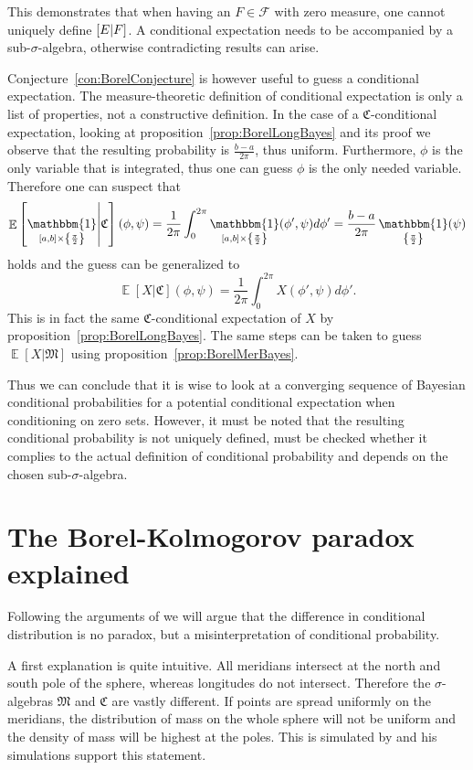\documentclass[twoside,a4paper]{report}
\theoremstyle{plain}
\theoremstyle{definition}
\theoremstyle{remark}
\numberwithin{equation}{chapter}
\let\P\relax
\DeclareMathOperator{\P}{\mathbb{P}}
\DeclareMathOperator{\E}{\mathbb{E}}
\DeclareMathOperator{\1}{\mathbbm{1}}
\newcommand{\F}{\mathcal{F}}
\begin{document}
This demonstrates that when having an $F\in\F$ with zero measure, one cannot uniquely define $\P[E|F]$. A conditional expectation needs to be accompanied by a sub-$\sigma$-algebra, otherwise contradicting results can arise.

Conjecture~\ref{con:BorelConjecture} is however useful to guess a conditional expectation. The measure-theoretic definition of conditional expectation is only a list of properties, not a constructive definition. In the case of a $\mathfrak{C}$-conditional expectation, looking at proposition~\ref{prop:BorelLongBayes} and its proof we observe that the resulting probability is $\frac{b-a}{2\pi}$, thus uniform. Furthermore, $\phi$ is the only variable that is integrated, thus one can guess $\phi$ is the only needed variable. Therefore one can suspect that
\begin{equation}
\E\left[\1_{[a,b]\times\left\{\frac{\pi}{2}\right\}}\middle|\mathfrak{C}\right](\phi,\psi)=\frac{1}{2\pi}\int_0^{2\pi}\1_{[a,b]\times\left\{\frac{\pi}{2}\right\}}(\phi',\psi)d\phi'=\frac{b-a}{2\pi}\1_{\left\{\frac{\pi}{2}\right\}}(\psi)
\end{equation}
holds and the guess can be generalized to
\begin{equation}
\E[X|\mathfrak{C}](\phi,\psi)=\frac{1}{2\pi}\int_0^{2\pi}X(\phi',\psi)d\phi'.
\end{equation}
This is in fact the same $\mathfrak{C}$-conditional expectation of $X$ by proposition~\ref{prop:BorelLongBayes}. The same steps can be taken to guess $\E[X|\mathfrak{M}]$ using proposition~\ref{prop:BorelMerBayes}. 

Thus we can conclude that it is wise to look at a converging sequence of Bayesian conditional probabilities for a potential conditional expectation when conditioning on zero sets. However, it must be noted that the resulting conditional probability is not uniquely defined, must be checked whether it complies to the actual definition of conditional probability and depends on the chosen sub-$\sigma$-algebra.

\section{The Borel-Kolmogorov paradox explained}\label{sec:BorelExplained}
Following the arguments of \cite{Gyenis17} we will argue that the difference in conditional distribution is no paradox, but a misinterpretation of conditional probability.

A first explanation is quite intuitive. All meridians intersect at the north and south pole of the sphere, whereas longitudes do not intersect. Therefore the $\sigma$-algebras $\mathfrak{M}$ and $\mathfrak{C}$ are vastly different. If points are spread uniformly on the meridians, the distribution of mass on the whole sphere will not be uniform and the density of mass will be highest at the poles. This is simulated by \cite{Weisstein} and his simulations support this statement.
\end{document}
